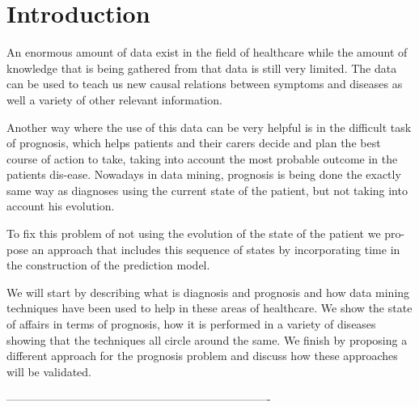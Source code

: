 \newcommand{\hl}[2][yellow]{\textcolor{#1}{#2}}

\chapter{Introduction}
\label{chapter:introduction}

An enormous amount of data exist in the field of healthcare while the amount of knowledge that is being gathered from that data is still very limited.
 The data can be used to teach us new causal relations between symptoms and diseases as well a variety of other relevant information. 

Another way where the use of this data can be very helpful is in the difficult task of prognosis, which helps patients and their carers decide and 
plan the best course of action to take, taking into account the most probable outcome in the patients dis-ease. Nowadays in data mining, prognosis is
 being done the exactly same way as diagnoses using the current state of the patient, but not taking into account his evolution.

To fix this problem of not using the evolution of the state of the patient we pro-pose an approach that includes this sequence of states by
 incorporating time in the construction of the prediction model.

We will start by describing what is diagnosis and prognosis and how data mining techniques have been used to help in these areas of healthcare.
 We show the state of affairs in terms of prognosis, how it is performed in a variety of diseases showing that the techniques all circle around
 the same. We finish by proposing a different approach for the prognosis problem and discuss how these approaches will be validated. 

----------------------------------------------------------------------

